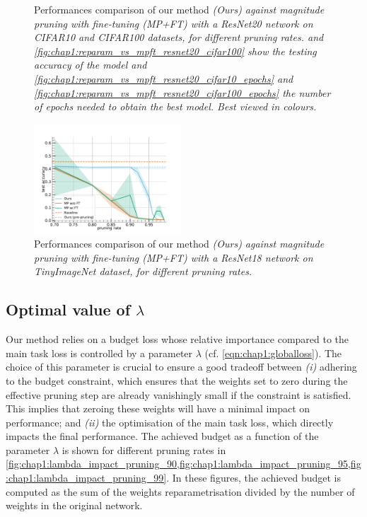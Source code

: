 \begin{figure}
  \caption{ Performances comparison of our method \em{(Ours)} against
  magnitude pruning with fine-tuning \em{(MP+FT)} with a ResNet20 network on
  CIFAR10 and CIFAR100 datasets, for different pruning rates.
   and
  \cref{fig:chap1:reparam_vs_mpft_resnet20_cifar100} show the
  testing accuracy of the model and
  \cref{fig:chap1:reparam_vs_mpft_resnet20_cifar10_epochs} and
  \cref{fig:chap1:reparam_vs_mpft_resnet20_cifar100_epochs}
  the number of epochs needed to obtain the best model. Best viewed in colours.}
  \label{fig:chap1:reparam_vs_mpft_resnet20}
\end{figure}


\begin{figure}
  \centering
  \includegraphics[width=0.49\textwidth]{chapter_1/assets/reparam_vs_mpft_PrunableResNet18_tinyimagenet.pdf}
  \caption{Performances comparison of our method \em{(Ours)} against
  magnitude pruning with fine-tuning \em{(MP+FT)} with a ResNet18 network on
  TinyImageNet dataset, for different pruning rates.}
  \label{fig:chap1:reparam_vs_mpft_resnet18}
\end{figure}



\subsection{Optimal value of \texorpdfstring{$\lambda$}{Lambda}}
\label{sec:chap1:impact_of_lambda}


Our method relies on a budget loss whose relative importance compared to the
main task loss is controlled by a parameter $\lambda$ (cf.
\cref{eqn:chap1:globalloss}). The choice of this parameter is crucial to ensure
a good tradeoff between \emph{(i)} adhering to the budget constraint, which
ensures that the weights set to zero during the effective pruning step are
already vanishingly small if the constraint is satisfied. This implies that
zeroing these weights will have a minimal impact on performance; and \emph{(ii)}
the optimisation of the main task loss, which directly impacts the final
performance. The achieved budget as a function of the parameter $\lambda$ is
shown for different pruning rates in
\cref{fig:chap1:lambda_impact_pruning_90,fig:chap1:lambda_impact_pruning_95,fig:chap1:lambda_impact_pruning_99}.
In these figures, the achieved budget is computed as the sum of the weights
reparametrisation divided by the number of weights in the original network.\\

